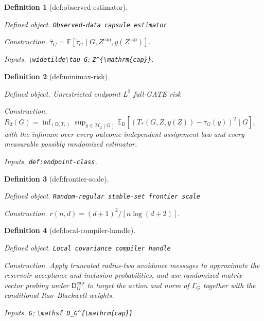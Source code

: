 \documentclass{article}
\newtheorem{definition}{Definition}
\begin{document}
\begin{definition}[def:observed-estimator]\label{def:observed-estimator}
\par\smallskip\noindent\emph{Defined object.} \texttt{Observed-\allowbreak{}data capsule estimator}
\par\smallskip\noindent\emph{Construction.} \(\widehat\tau_G=\mathbb E[\widetilde\tau_G\mid G,Z^{\mathrm{cap}},y(Z^{\mathrm{cap}})]\).
\par\smallskip\noindent\emph{Inputs.} \texttt{\textbackslash{}\allowbreak{}widetilde\textbackslash{}\allowbreak{}tau\_\allowbreak{}G}; \texttt{Z\textasciicircum{}\{\textbackslash{}\allowbreak{}mathrm\{cap\}\allowbreak{}\}\allowbreak{}}.
\end{definition}

\begin{definition}[def:minimax-risk]\label{def:minimax-risk}
\par\smallskip\noindent\emph{Defined object.} Unrestricted endpoint-\(L^2\) full-GATE risk
\par\smallskip\noindent\emph{Construction.} \(R_2(G)=\inf_{(\mathsf D,T_*)}\sup_{y\in\mathcal M_2(G)}\mathbb E_{\mathsf D}[(T_*(G,Z,y(Z))-\tau_G(y))^2\mid G]\), with the infimum over every outcome-independent assignment law and every measurable possibly randomized estimator.
\par\smallskip\noindent\emph{Inputs.} \texttt{def:\allowbreak{}endpoint-\allowbreak{}class}.
\end{definition}

\begin{definition}[def:frontier-scale]\label{def:frontier-scale}
\par\smallskip\noindent\emph{Defined object.} \texttt{Random-\allowbreak{}regular stable-\allowbreak{}set frontier scale}
\par\smallskip\noindent\emph{Construction.} \(r(n,d)=(d+1)^2/[n\log(d+2)]\).
\end{definition}

\begin{definition}[def:local-compiler-handle]\label{def:local-compiler-handle}
\par\smallskip\noindent\emph{Defined object.} \texttt{Local covariance compiler handle}
\par\smallskip\noindent\emph{Construction.} Apply truncated radius-two avoidance messages to approximate the reservoir acceptance and inclusion probabilities, and use randomized matrix--vector probing under \(\mathsf D_G^{\mathrm{cap}}\) to target the action and norm of \(\Gamma_G\) together with the conditional Rao--Blackwell weights.
\par\smallskip\noindent\emph{Inputs.} \texttt{G}; \texttt{\textbackslash{}\allowbreak{}mathsf D\_\allowbreak{}G\textasciicircum{}\{\textbackslash{}\allowbreak{}mathrm\{cap\}\allowbreak{}\}\allowbreak{}}.
\end{definition}
\end{document}
